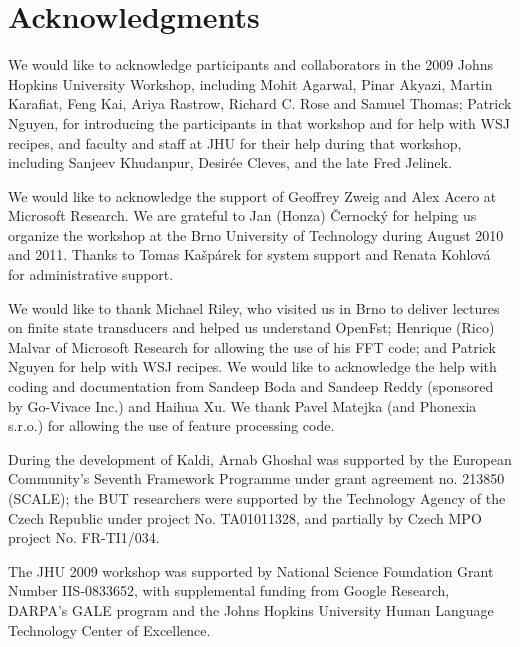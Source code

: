 \documentclass[10pt,conference,letterpaper]{IEEEtran}
\begin{document}
\section*{Acknowledgments}

{\footnotesize
We would like to acknowledge participants and collaborators in the 2009 Johns
Hopkins University Workshop, including Mohit Agarwal, Pinar Akyazi, Martin
Karafiat, Feng Kai, Ariya Rastrow, Richard C. Rose and Samuel Thomas; Patrick
Nguyen, for introducing the participants in that workshop and for help with WSJ
recipes, and faculty and staff at JHU for their help during that workshop, 
including Sanjeev Khudanpur, Desir\'{e}e Cleves, and the late Fred Jelinek.  

We would like to acknowledge the support of Geoffrey Zweig and Alex Acero at 
Microsoft Research.  We are grateful to Jan (Honza) \v{C}ernock\'{y} 
for helping us organize the workshop at the Brno University of Technology 
during August 2010 and 2011. Thanks to Tomas Ka\v{s}p\'{a}rek for system 
support and Renata Kohlov\'{a} for administrative support.  

We would like to thank Michael Riley, who visited us in Brno to deliver 
lectures on finite state transducers and helped us understand OpenFst; Henrique 
(Rico) Malvar of Microsoft Research for allowing the use of his FFT code; and 
Patrick Nguyen for help with WSJ recipes. 
We would like to acknowledge the help with coding and documentation from 
Sandeep Boda and Sandeep Reddy (sponsored by Go-Vivace Inc.) and Haihua Xu.  
We thank Pavel Matejka (and Phonexia s.r.o.) for allowing the use of feature 
processing code. 


During the development of Kaldi, Arnab Ghoshal was supported by the European 
Community's Seventh Framework Programme under grant agreement no. 213850 
(SCALE); the BUT researchers were supported by the Technology Agency of the 
Czech Republic under project No. TA01011328, and partially by Czech MPO project 
No. FR-TI1/034. 

The JHU 2009 workshop was supported by National Science Foundation Grant Number
IIS-0833652, with supplemental funding from Google Research, DARPA's GALE program
and the Johns Hopkins University Human Language Technology Center of Excellence.

}



\end{document}

